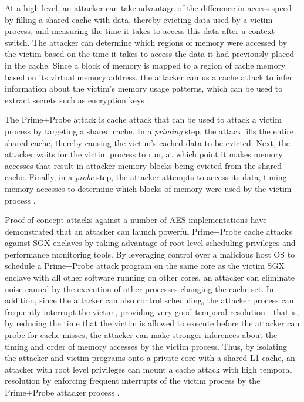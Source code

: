 At a high level, an attacker can take advantage of the difference in access speed by filling a shared cache with data, thereby evicting data used by a victim process, and measuring the time it takes to access this data after a context switch. The attacker can determine which regions of memory were accessed by the victim based on the time it takes to access the data it had previously placed in the cache. Since a block of memory is mapped to a region of cache memory based on its virtual memory address, the attacker can us a cache attack to infer information about the victim's memory usage patterns, which can be used to extract secrets such as encryption keys \cite{moghimi_cachezoom:_2017, gotzfried_cache_2017}.

The Prime+Probe attack is cache attack that can be used to attack a victim process by targeting a shared cache. In a \emph{priming} step, the attack fills the entire shared cache, thereby causing the victim's cached data to be evicted. Next, the attacker waits for the victim process to run, at which point it makes memory accesses that result in attacker memory blocks being evicted from the shared cache. Finally, in a \emph{probe} step, the attacker attempts to access its data, timing memory accesses to determine which blocks of memory were used by the victim process \cite{moghimi_cachezoom:_2017, gotzfried_cache_2017}.

Proof of concept attacks against a number of AES implementations have demonstrated that an attacker can launch powerful Prime+Probe cache attacks against SGX enclaves by taking advantage of root-level scheduling privileges and performance monitoring tools. By leveraging control over a malicious host OS to schedule a Prime\-+Probe attack program on the same core as the victim SGX enclave with all other software running on other cores, an attacker can eliminate noise caused by the execution of other processes changing the cache set. In addition, since the attacker can also control scheduling, the attacker process can frequently interrupt the victim, providing very good temporal resolution - that is, by reducing the time that the victim is allowed to execute before the attacker can probe for cache misses, the attacker can make stronger inferences about the timing and order of memory accesses by the victim process. Thus, by isolating the attacker and victim programs onto a private core with a shared L1 cache, an attacker with root level privileges can mount a cache attack with high temporal resolution by enforcing frequent interrupts of the victim process by the Prime+Probe attacker process \cite{moghimi_cachezoom:_2017, gotzfried_cache_2017}.

